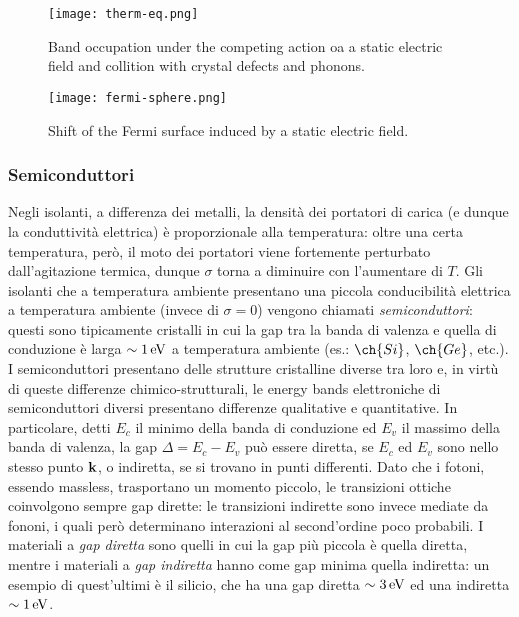 \begin{figure}
	\centering
	\texttt{[image: therm-eq.png]}
	\caption{Band occupation under the competing action oa a static electric field and collition with crystal defects and phonons.}
	\label{therm-eq}
\end{figure}
\begin{figure}
	\centering
	\texttt{[image: fermi-sphere.png]}
	\caption{Shift of the Fermi surface induced by a static electric field.}
	\label{f-sph}
\end{figure}

\subsubsection{Semiconduttori}

Negli isolanti, a differenza dei metalli, la densità dei portatori di carica (e dunque la conduttività elettrica) è proporzionale alla temperatura: oltre una certa temperatura, però, il moto dei portatori viene fortemente perturbato dall'agitazione termica, dunque $ \sigma $ torna a diminuire con l'aumentare di $ T $. Gli isolanti che a temperatura ambiente presentano una piccola conducibilità elettrica a temperatura ambiente (invece di $ \sigma = 0 $) vengono chiamati \textit{semiconduttori}: questi sono tipicamente cristalli in cui la gap tra la banda di valenza e quella di conduzione è larga $ \sim 1\,\mathrm{eV} $ a temperatura ambiente (es.: $ \ch{Si} $, $ \ch{Ge} $, etc.). \\
I semiconduttori presentano delle strutture cristalline diverse tra loro e, in virtù di queste differenze chimico-strutturali, le energy bands elettroniche di semiconduttori diversi presentano differenze qualitative e quantitative. In particolare, detti $ E_c $ il minimo della banda di conduzione ed $ E_v $ il massimo della banda di valenza, la gap $ \Delta = E_c - E_v $ può essere diretta, se $ E_c $ ed $ E_v $ sono nello stesso punto $ \mathbf{k} $, o indiretta, se si trovano in punti differenti. Dato che i fotoni, essendo massless, trasportano un momento piccolo, le transizioni ottiche coinvolgono sempre gap dirette: le transizioni indirette sono invece mediate da fononi, i quali però determinano interazioni al second'ordine poco probabili. I materiali a \textit{gap diretta} sono quelli in cui la gap più piccola è quella diretta, mentre i materiali a \textit{gap indiretta} hanno come gap minima quella indiretta: un esempio di quest'ultimi è il silicio, che ha una gap diretta $ \sim 3\,\mathrm{eV} $ ed una indiretta $ \sim 1\,\mathrm{eV} $.

